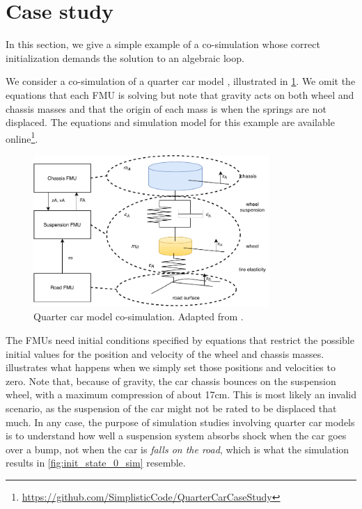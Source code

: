 \section{Case study}
\label{sec:case_study}
In this section, we give a simple example of a co-simulation whose correct initialization demands the solution to an algebraic loop.

We consider a co-simulation of a quarter car model \cite[Section 6.4]{Schramm2014}, illustrated in \cref{fig:quarter_car}.
We omit the equations that each FMU is solving but note that gravity acts on both wheel and chassis masses and that the origin of each mass is when the springs are not displaced.
The equations and simulation model for this example are available online\footnote{\url{https://github.com/SimplisticCode/QuarterCarCaseStudy}}. 

\begin{figure}[htb]
    \centering
    \includegraphics[width=0.8\textwidth]{images/quarter_car.pdf}
    \caption{Quarter car model co-simulation. Adapted from \cite[Section 6.4]{Schramm2014}.}
    \label{fig:quarter_car}
\end{figure}

The FMUs need initial conditions specified by equations that restrict the possible initial values for the position and velocity of the wheel and chassis masses.
 illustrates what happens when we simply set those positions and velocities to zero.
Note that, because of gravity, the car chassis bounces on the suspension wheel, with a maximum compression of about 17cm. This is most likely an invalid scenario, as the suspension of the car might not be rated to be displaced that much. In any case, the purpose of simulation studies involving quarter car models is to understand how well a suspension system absorbs shock when the car goes over a bump, not when the car is \emph{falls on the road}, which is what the simulation results in \cref{fig:init_state_0_sim} resemble.

